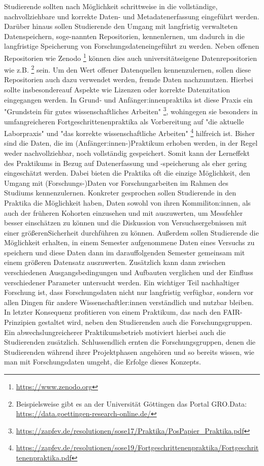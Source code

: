 \documentclass[DIV=calc]{scrartcl}
\begin{document}
Studierende sollten nach Möglichkeit schrittweise in die vollständige, nachvollziehbare und korrekte Daten- und Metadatenerfassung eingeführt werden.
Darüber hinaus sollen Studierende den Umgang mit langfristig verwalteten Datenspeichern, soge-nannten Repositorien, kennenlernen, um dadurch in die langfristige Speicherung von Forschungsdateneingeführt zu werden. 
Neben offenen Repositorien wie Zenodo \footnote{\url{https://www.zenodo.org}} können dies auch universitätseigene Datenrepositorien wie z.B. \footnote{Beispielsweise gibt es an der Universität Göttingen das Portal GRO.Data: \url{https://data.goettingen-research-online.de/}} sein. 
Um den Wert offener Datenquellen kennenzulernen, sollen diese Repositorien auch dazu verwendet werden, fremde Daten nachzunutzen. 
Hierbei sollte insbesondereauf Aspekte wie Lizenzen oder korrekte Datenzitation eingegangen werden.
In Grund- und Anfänger:innenpraktika ist diese Praxis ein "Grundstein für gutes wissenschaftliches Arbeiten" \footnote{\url{https://zapfev.de/resolutionen/sose17/Praktika/PosPapier_Praktika.pdf}}, 
wohingegen sie besonders in umfangreicheren Fortgeschrittenenpraktika als Vorbereitung auf "die aktuelle Laborpraxis" und "das korrekte wissenschaftliche Arbeiten" \footnote{\url{https://zapfev.de/resolutionen/sose19/Fortgeschrittenenpraktika/Fortgeschrittenenpraktika.pdf}} hilfreich ist.
Bisher sind die Daten, die im (Anfänger:innen-)Praktikum erhoben werden, in der Regel weder nachvollziehbar, noch vollständig gespeichert. 
Somit kann der Lerneffekt des Praktikums in Bezug auf Datenerfassung und -speicherung als eher gering eingeschätzt werden. 
Dabei bieten die Praktika oft die einzige Möglichkeit, den Umgang mit (Forschungs-)Daten vor Forschungarbeiten im Rahmen des Studiums kennenzulernen.
Konkreter gesprochen sollen Studierende in den Praktika die Möglichkeit haben, Daten sowohl von ihren Kommiliton:innen, als auch der früheren Kohorten einzusehen und mit auszuwerten, 
um Messfehler besser einschätzen zu können und die Diskussion von Versuchsergebnissen mit einer größerenSicherheit durchführen zu können. 
Außerdem sollen Studierende die Möglichkeit erhalten, in einem Semester aufgenommene Daten eines Versuchs zu speichern 
und diese Daten dann im darauffolgenden Semester gemeinsam mit einem größeren Datensatz auszuwerten. 
Zusätzlich kann dann zwischen verschiedenen Ausgangsbedingungen und Aufbauten verglichen und der Einfluss verschiedener Parameter untersucht werden.
Ein wichtiger Teil nachhaltiger Forschung ist, dass Forschungsdaten nicht nur langfristig verfügbar, sondern vor allen Dingen für andere Wissenschaftler:innen verständlich und nutzbar bleiben. 
In letzter Konsequenz profitieren von einem Praktikum, das nach den FAIR-Prinzipien gestaltet wird, neben den Studierenden auch die Forschungsgruppen. 
Ein abwechslungreicherer Praktikumsbetrieb motiviert hierbei auch die Studierenden zusätzlich. 
Schlussendlich ernten die Forschungsgruppen, denen die Studierenden während ihrer Projektphasen angehören und so bereits wissen, wie man mit Forschungsdaten umgeht, die Erfolge dieses Konzepts. \\
\end{document}
